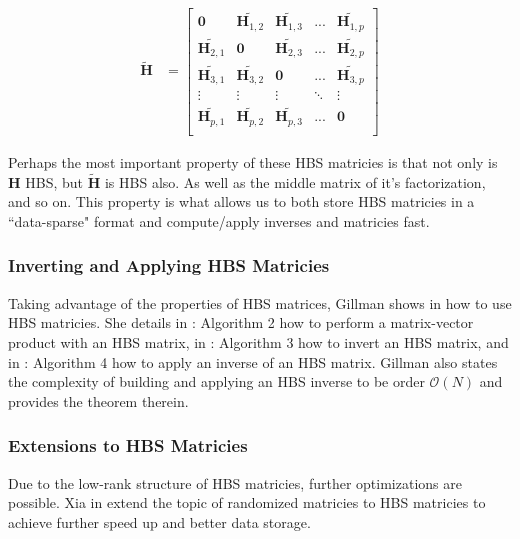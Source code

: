 \begin{align}
    \tilde{\textbf{H}} &=
    \begin{bmatrix}
        \textbf{0}       & \tilde{\textbf{H}_{1,2}} & \tilde{\textbf{H}_{1,3}} & ...    & \tilde{\textbf{H}_{1,p}} \\
        \tilde{\textbf{H}_{2,1}} & \textbf{0}       & \tilde{\textbf{H}_{2,3}} & ...    & \tilde{\textbf{H}_{2,p}} \\
        \tilde{\textbf{H}_{3,1}} & \tilde{\textbf{H}_{3,2}} & \textbf{0}       & ...    & \tilde{\textbf{H}_{3,p}} \\
        \vdots           & \vdots           & \vdots           & \ddots & \vdots           \\
        \tilde{\textbf{H}_{p,1}} & \tilde{\textbf{H}_{p,2}} & \tilde{\textbf{H}_{p,3}} & ...    & \textbf{0}       \\
    \end{bmatrix}
\end{align}

Perhaps the most important property of these HBS matricies is that not only is $\textbf{H}$ HBS, but $\tilde{\textbf{H}}$ is HBS also. As well as the middle matrix of it's factorization, and so on. This property is what allows us to both store HBS matricies in a ``data-sparse" format and compute/apply inverses and matricies fast.

\subsubsection{Inverting and Applying HBS Matricies}
\label{subsub:applyHBS}

Taking advantage of the properties of HBS matrices, Gillman shows in \cite{gillman2012direct} how to use HBS matricies. She details in \cite{gillman2012direct}: Algorithm 2 how to perform a matrix-vector product with an HBS matrix, in \cite{gillman2012direct}: Algorithm 3 how to invert an HBS matrix, and in \cite{gillman2012direct}: Algorithm 4 how to apply an inverse of an HBS matrix. Gillman also states the complexity of building and applying an HBS inverse to be order $\mathcal{O}(N)$ and provides the theorem therein.

\subsubsection{Extensions to HBS Matricies}

Due to the low-rank structure of HBS matricies, further optimizations are possible. Xia in \cite{xia2013randomized} extend the topic of randomized matricies to HBS matricies to achieve further speed up and better data storage.

